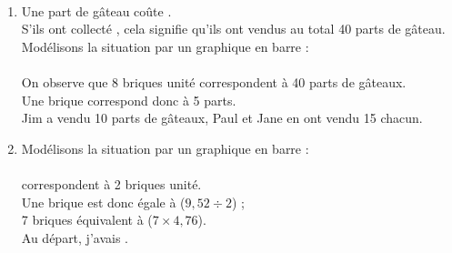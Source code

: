\begin{colonne*exercice}
\begin{corrige}
\ \\ [-5mm]
   \begin{enumerate}
      \item Une part de gâteau coûte . \\
         S'ils ont collecté , cela signifie qu'ils ont vendus au total 40 parts de gâteau. \\
         Modélisons la situation par un graphique en barre : \\ [1mm]
          \\
         On observe que 8 briques unité correspondent à 40 parts de gâteaux. \\
         Une brique correspond donc à 5 parts. \\
         {\blue Jim a vendu 10 parts de gâteaux, Paul et Jane en ont vendu 15 chacun}.
      \item Modélisons la situation par un graphique en barre : \\ [1mm]
          \\
          correspondent à 2 briques unité. \\
         Une brique est donc égale à  ($9,52\div2$) ; \\
         7 briques équivalent à  ($7\times4,76$). \\
         {\blue Au départ, j'avais .}
   \end{enumerate}
\end{corrige}

\end{colonne*exercice}


\Recreation

